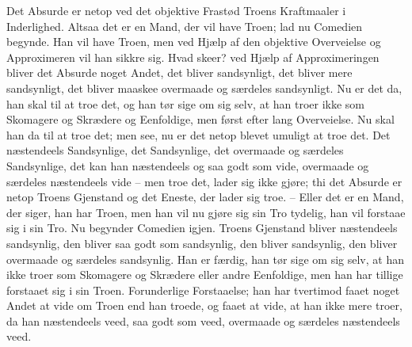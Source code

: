 \documentclass[12pt,a4paper]{article}
\begin{document}
Det Absurde er netop ved det objektive Frastød Troens Kraftmaaler i Inderlighed. Altsaa det er en Mand, der vil have Troen; lad nu Comedien begynde. Han vil have Troen, men ved Hjælp af den objektive Overveielse og Approximeren vil han sikkre sig. Hvad skeer? ved Hjælp af Approximeringen bliver det Absurde noget Andet, det bliver sandsynligt, det bliver mere sandsynligt, det bliver maaskee overmaade og særdeles sandsynligt. Nu er det da, han skal til at troe det, og han tør sige om sig selv, at han troer ikke som Skomagere og Skrædere og Eenfoldige, men først efter lang Overveielse. Nu skal han da til at troe det; men see, nu er det netop blevet umuligt at troe det. Det næstendeels Sandsynlige, det Sandsynlige, det overmaade og særdeles Sandsynlige, det kan han næstendeels og saa godt som vide, overmaade og særdeles næstendeels vide – men troe det, lader sig ikke gjøre; thi det Absurde er netop Troens Gjenstand og det Eneste, der lader sig troe. – Eller det er en Mand, der siger, han har Troen, men han vil nu gjøre sig sin Tro tydelig, han vil forstaae sig i sin Tro. Nu begynder Comedien igjen. Troens Gjenstand bliver næstendeels sandsynlig, den bliver saa godt som sandsynlig, den bliver sandsynlig, den bliver overmaade og særdeles sandsynlig. Han er færdig, han tør sige om sig selv, at han ikke troer som Skomagere og Skrædere eller andre Eenfoldige, men han har tillige forstaaet sig i sin Troen. Forunderlige Forstaaelse; han har tvertimod faaet noget Andet at vide om Troen end han troede, og faaet at vide, at han ikke mere troer, da han næstendeels veed, saa godt som veed, overmaade og særdeles næstendeels veed.
\end{document}

